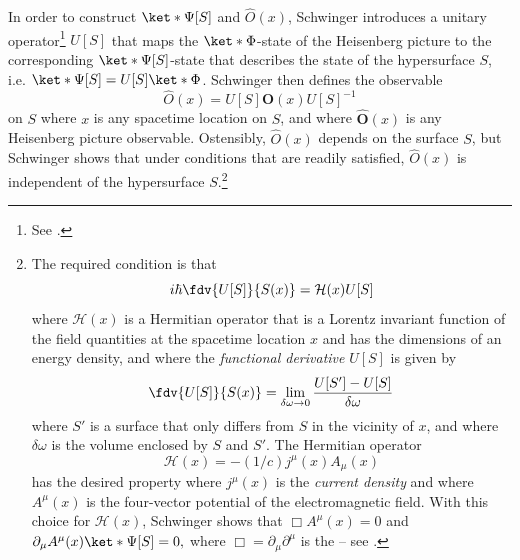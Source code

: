 \documentclass[12pt]{report}
\providecommand{\DIFaddbegin}{} %
\providecommand{\DIFaddend}{} %
\providecommand{\DIFdelbegin}{} %
\providecommand{\DIFdelend}{} %
\begin{document}
In order to construct $\ket*{\Psi[S]}$ and $\hat{O}(x)$, Schwinger introduces a unitary operator\footnote{See \cite[p. 1448]{SchwingerJulianI}.} $U[S]$ \DIFaddbegin \label{SchwingerOperator}  \DIFaddend %
%
that maps the $\ket*{\Phi}$-state of the Heisenberg picture to the corresponding $\ket*{\Psi[S]}$-state that describes the state of the hypersurface $S$, i.e. $\ket*{\Psi[S]}=U[S]\ket*{\Phi}$. Schwinger then defines the observable  
\begin{equation}\label{tsobservable}
  \hat{O}(x)=U[S]\hat{\bm{O}}(x)U[S]^{-1}
\end{equation}
on $S$ where $x$ is any spacetime location on $S$, and where $\hat{\bm{O}}(x)$ is any Heisenberg picture observable. Ostensibly, $\hat{O}(x)$ depends on the surface $S$,  but Schwinger shows that under conditions that are readily satisfied, $\hat{O}(x)$ is independent of the hypersurface $S$.\footnote{
  The required condition is that 
  $$i\hbar\fdv{U[S]}{S(x)}=\mathcal{H}(x)U[S] $$
  where $\mathcal{H}(x)$ is a Hermitian operator that is a Lorentz invariant function of the field quantities at the spacetime location $x$ and has the dimensions of an energy density, and where the \emph{functional derivative} $U[S]$ is given by
  \begin{equation}\label{fddef}
  \fdv{U[S]}{S(x)}=\lim_{\delta \omega\rightarrow 0}\frac{U[S']-U[S]}{\delta\omega}
  \end{equation}%
  where $S'$ is a surface that only differs from $S$ in the vicinity of $x$, and where $\delta\omega$ is the volume enclosed by $S$ and $S'$. The Hermitian operator $$\mathcal{H}(x)=-(1/c)j^\mu(x)A_\mu(x)$$
  has the desired property where $j^\mu(x)$ %
  \DIFdelbegin %
\DIFdelend \DIFaddbegin {}\DIFaddend %
  is the \emph{current density} and where $A^\mu(x)$ %
   is the four-vector potential of the electromagnetic field. With this choice for $\mathcal{H}(x)$, Schwinger shows that $\Box A^\mu(x)=0$ and $\partial_\mu A^\mu(x)\ket*{\Psi[S]}=0,$ where $\Box=\partial_\mu\partial^\mu$ is %
    the  -- see \cite[p. 1449-1450]{SchwingerJulianI}.\label{Sindepedence}  }
\end{document}
